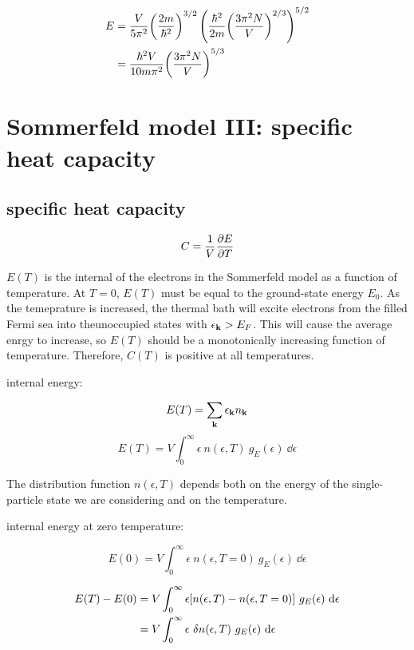 \documentclass[10pt, a4paper, twocolumn]{article}
\begin{document}
\begin{equation*}
\begin{aligned}
E &= \frac{V}{5 \pi ^2} \qty( \frac{2m}{\hbar ^2})^{3/2}
\left( \frac{\hbar ^2}{2m}
\qty( \frac{3 \pi ^2 N}{V})^{2/3}
\right)^{5/2}
\\ &= \frac{\hbar ^2 V}{10 m \pi ^2}
\qty(\frac{3 \pi ^2 N}{V} )^{5/3}
\end{aligned}
\end{equation*}

\section{Sommerfeld model III: specific heat capacity}

\subsection{specific heat capacity}

\[ C = \frac1V \pdv{E}{T} \]

$E(T)$ is the internal of the electrons in the Sommerfeld model as a function of temperature.
At $T=0$, $E(T)$ must be equal to the ground-state energy $E_0$.
As the temeprature is increased, the thermal bath will excite electrons from the filled Fermi sea into theunoccupied states with $\epsilon _{\vb k} > E_F$.
This will cause the average enrgy to increase, so $E(T)$ should be a monotonically increasing function of temperature. 
Therefore, $C(T)$ is positive at all temperatures.

internal energy:

\[ E(T) = \sum _{\vb k} \epsilon _{\vb k} n _{\vb k} \]
\[ E(T) =  V \int _0^\infty
\epsilon \ n(\epsilon ,T) \ g_E (\epsilon )
\ \dd \epsilon \]

The distribution function $n(\epsilon , T)$ depends both on the energy of the single-particle state we are considering and on the temperature.

internal energy at zero temperature:

\[ E(0) = V \int _0 ^\infty \epsilon
\ n (\epsilon ,T = 0) \ g_E (\epsilon ) \ \dd \epsilon \]

\begin{equation*}
\begin{aligned}
E(T) - E(0) &=
V \int _0^\infty
\epsilon \qty[ n(\epsilon , T) - n (\epsilon , T=0)]
\ g_E (\epsilon) \ \dd \epsilon
\\ &= 
V \int _0^\infty
\epsilon \ \delta n (\epsilon , T ) 
\ g_E (\epsilon) \ \dd \epsilon
\end{aligned}
\end{equation*}
\end{document}
